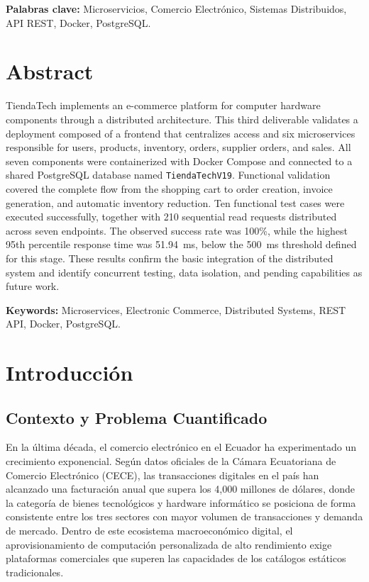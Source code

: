 \documentclass[12pt]{article}
\begin{document}
    \textbf{Palabras clave:} Microservicios, Comercio Electrónico, Sistemas Distribuidos, API REST, Docker, PostgreSQL.

    \newpage

    \section*{Abstract}

    TiendaTech implements an e-commerce platform for computer hardware components through a distributed architecture. This third deliverable validates a deployment composed of a frontend that centralizes access and six microservices responsible for users, products, inventory, orders, supplier orders, and sales. All seven components were containerized with Docker Compose and connected to a shared PostgreSQL database named \texttt{TiendaTechV19}. Functional validation covered the complete flow from the shopping cart to order creation, invoice generation, and automatic inventory reduction. Ten functional test cases were executed successfully, together with 210 sequential read requests distributed across seven endpoints. The observed success rate was 100\%, while the highest 95th percentile response time was 51.94~ms, below the 500~ms threshold defined for this stage. These results confirm the basic integration of the distributed system and identify concurrent testing, data isolation, and pending capabilities as future work.

    \vspace{1cm}

    \textbf{Keywords:} Microservices, Electronic Commerce, Distributed Systems, REST API, Docker, PostgreSQL.




    \section{Introducción}

    \subsection{Contexto y Problema Cuantificado}
    En la última década, el comercio electrónico en el Ecuador ha experimentado un crecimiento exponencial. Según datos oficiales de la Cámara Ecuatoriana de Comercio Electrónico (CECE), las transacciones digitales en el país han alcanzado una facturación anual que supera los 4,000 millones de dólares, donde la categoría de bienes tecnológicos y hardware informático se posiciona de forma consistente entre los tres sectores con mayor volumen de transacciones y demanda de mercado. Dentro de este ecosistema macroeconómico digital, el aprovisionamiento de computación personalizada de alto rendimiento exige plataformas comerciales que superen las capacidades de los catálogos estáticos tradicionales.
\end{document}
